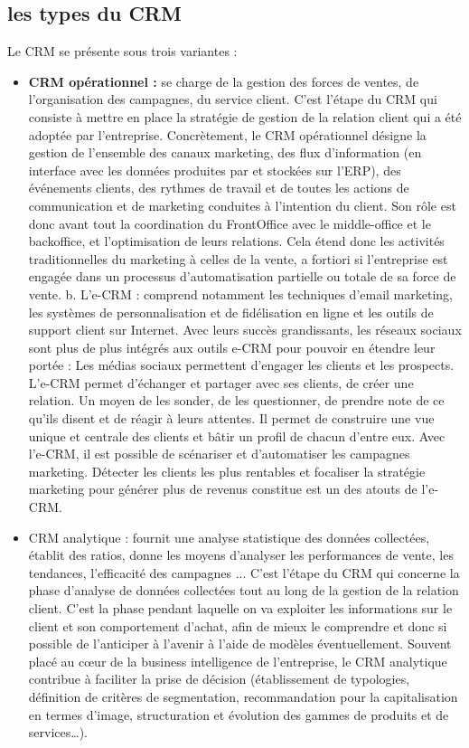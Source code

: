 \documentclass[a4paper, 12pt]{report}
\begin{document}
\begin{itemize}
\subsection{les types du CRM}
Le CRM se présente sous trois variantes : 
\begin{itemize}
	\item 
	 \textbf{CRM opérationnel :} se charge de la gestion des forces de ventes, de l'organisation des campagnes, du service client.
C'est l’étape du CRM qui consiste à mettre en place la stratégie de gestion de la relation client qui a été adoptée par l'entreprise. Concrètement, le CRM opérationnel désigne la gestion de l'ensemble des canaux marketing, des flux d'information (en interface avec les données produites par et stockées sur l'ERP), des événements clients, des rythmes de travail et de toutes les actions de communication et de marketing conduites à l'intention du client. Son rôle est donc avant tout la coordination du FrontOffice avec le middle-office et le backoffice, et l'optimisation de leurs relations. Cela étend donc les activités traditionnelles du marketing à celles de la vente, a fortiori si l'entreprise est engagée dans un processus d'automatisation partielle ou totale de sa force de vente.
b.	 L'e-CRM : comprend notamment les techniques d'email marketing, les systèmes de personnalisation et de fidélisation en ligne et les outils de support client sur Internet. Avec leurs succès grandissants, les réseaux sociaux sont plus de plus intégrés aux outils e-CRM pour pouvoir en étendre leur portée : Les médias sociaux permettent d'engager les clients et les prospects. L'e-CRM permet d'échanger et partager avec ses clients, de créer une relation. Un moyen de les sonder, de les questionner, de prendre note de ce qu'ils disent et de réagir à leurs attentes. Il permet de construire une vue unique et centrale des clients et bâtir un profil de chacun d'entre eux. Avec l'e-CRM, il est possible de scénariser et d'automatiser les campagnes marketing. Détecter les clients les plus rentables et focaliser la stratégie marketing pour générer plus de revenus constitue est un des atouts de l'e-CRM. 
\item	CRM analytique : fournit une analyse statistique des données collectées, établit des ratios, donne les moyens d'analyser les performances de vente, les tendances, l'efficacité des campagnes ... 
C'est l'étape du CRM qui concerne la phase d'analyse de données collectées tout au long de la gestion de la relation client. C'est la phase pendant laquelle on va exploiter les informations sur le client et son comportement d'achat, afin de mieux le comprendre et donc si possible de l'anticiper à l'avenir à l'aide de modèles éventuellement. Souvent placé au cœur de la business intelligence de l'entreprise, le CRM analytique contribue à faciliter la prise de décision (établissement de typologies, définition de critères de segmentation, recommandation pour la capitalisation en termes d'image, structuration et évolution des gammes de produits et de services…).
\end{itemize}

\end{itemize}
\end{document}
